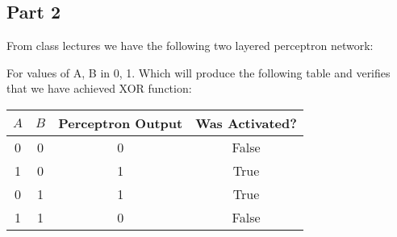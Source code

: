 \documentclass{article}
\begin{document}
    \subsection{Part 2}
    From class lectures we have the following two layered perceptron network:
    \linebreak
    \linebreak
    \linebreak
    \linebreak
    For values of A, B in {0, 1}. Which will produce the following table and verifies that we have achieved XOR function:
    \linebreak
    \linebreak
    \begin{tabular}{c c c c}
        $A$ & $B$ & Perceptron Output & Was Activated? \\
        \hline
        0 & 0 & 0 & False \\
        1 & 0 & 1 & True \\
        0 & 1 & 1 & True \\
        1 & 1 & 0 & False
    \end{tabular}
\end{document}
